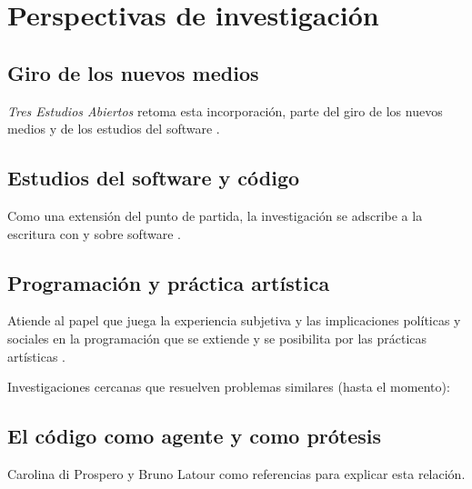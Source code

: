 
\chapter{Perspectivas de investigación}

\section{Giro de los nuevos medios}

\textit{Tres Estudios Abiertos} retoma esta incorporación, parte del giro de los nuevos medios y de los estudios del software \citep{manovichlanguage}.

\section{Estudios del software y código}

Como una extensión del punto de partida, la investigación se adscribe a la escritura con y sobre software \citep{aestheticProgramming}.

\section{Programación y práctica artística}

Atiende al papel que juega la experiencia subjetiva y las implicaciones políticas y sociales en la programación que se extiende y se posibilita por las prácticas artísticas \citep{speakingCode}. 

Investigaciones cercanas que resuelven problemas similares (hasta el momento):



\section{El código como agente y como prótesis}

Carolina di Prospero y Bruno Latour como referencias para explicar esta relación. 



